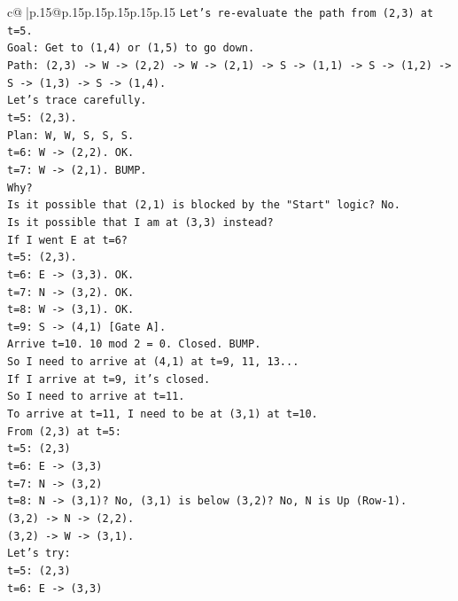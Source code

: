 \documentclass{article}
\begin{document}
{\begin{supertabular}{c@{$\;$}|p{.15\linewidth}@{}p{.15\linewidth}p{.15\linewidth}p{.15\linewidth}p{.15\linewidth}p{.15\linewidth}}
{{{\texttt{Let's re{-}evaluate the path from (2,3) at t=5.} \\
\texttt{Goal: Get to (1,4) or (1,5) to go down.} \\
\texttt{Path: (2,3) {-}> W {-}> (2,2) {-}> W {-}> (2,1) {-}> S {-}> (1,1) {-}> S {-}> (1,2) {-}> S {-}> (1,3) {-}> S {-}> (1,4).} \\
\texttt{Let's trace carefully.} \\
\texttt{t=5: (2,3).} \\
\texttt{Plan: W, W, S, S, S.} \\
\texttt{t=6: W {-}> (2,2). OK.} \\
\texttt{t=7: W {-}> (2,1). BUMP.} \\
\texttt{Why?} \\
\texttt{Is it possible that (2,1) is blocked by the "Start" logic? No.} \\
\texttt{Is it possible that I am at (3,3) instead?} \\
\texttt{If I went E at t=6?} \\
\texttt{t=5: (2,3).} \\
\texttt{t=6: E {-}> (3,3). OK.} \\
\texttt{t=7: N {-}> (3,2). OK.} \\
\texttt{t=8: W {-}> (3,1). OK.} \\
\texttt{t=9: S {-}> (4,1) {[}Gate A{]}.} \\
\texttt{Arrive t=10. 10 mod 2 = 0. Closed. BUMP.} \\
\texttt{So I need to arrive at (4,1) at t=9, 11, 13...} \\
\texttt{If I arrive at t=9, it's closed.} \\
\texttt{So I need to arrive at t=11.} \\
\texttt{To arrive at t=11, I need to be at (3,1) at t=10.} \\
\texttt{From (2,3) at t=5:} \\
\texttt{t=5: (2,3)} \\
\texttt{t=6: E {-}> (3,3)} \\
\texttt{t=7: N {-}> (3,2)} \\
\texttt{t=8: N {-}> (3,1)? No, (3,1) is below (3,2)? No, N is Up (Row{-}1).} \\
\texttt{(3,2) {-}> N {-}> (2,2).} \\
\texttt{(3,2) {-}> W {-}> (3,1).} \\
\texttt{Let's try:} \\
\texttt{t=5: (2,3)} \\
\texttt{t=6: E {-}> (3,3)} \\
}}}
\end{supertabular}}
\end{document}
